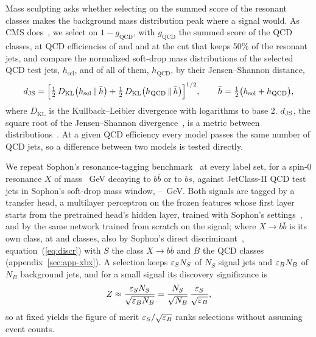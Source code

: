 Mass sculpting asks whether selecting on the summed score of the resonant classes makes the background mass
distribution peak where a signal would. As CMS does~\cite[Sec.~6.2]{cmspart}, we select on
$1 - g_{\mathrm{QCD}}$, with $g_{\mathrm{QCD}}$ the summed score of the QCD classes, at QCD efficiencies of
\SculptEffHigh{} and \SculptEffLow{} and at the cut that keeps 50\% of the resonant jets, and compare the
normalized soft-drop mass distributions of the selected QCD test jets, $h_{\mathrm{sel}}$, and of all of them,
$h_{\mathrm{QCD}}$, by their Jensen--Shannon distance,
\begin{equation}\label{eq:djs}
  d_{\mathrm{JS}} = \Bigl[\tfrac{1}{2}\,D_{\mathrm{KL}}\bigl(h_{\mathrm{sel}}\,\Vert\,\bar h\bigr)
        + \tfrac{1}{2}\,D_{\mathrm{KL}}\bigl(h_{\mathrm{QCD}}\,\Vert\,\bar h\bigr)\Bigr]^{1/2} , \qquad
  \bar h = \tfrac{1}{2}\bigl(h_{\mathrm{sel}} + h_{\mathrm{QCD}}\bigr) ,
\end{equation}
where $D_{\mathrm{KL}}$ is the Kullback--Leibler divergence with logarithms to base 2. $d_{\mathrm{JS}}$, the square root
of the Jensen--Shannon divergence~\cite{lin}, is a metric between distributions~\cite{endres}. At a given
QCD efficiency every model passes the same number of QCD jets, so a difference between two models is tested
directly.

We repeat Sophon's resonance-tagging benchmark~\cite[Sec.~III]{sophon} at every label set, for a spin-0
resonance $X$ of mass \XbxMx~GeV decaying to $b\bar b$ or to $bs$, against JetClass-II QCD test jets in Sophon's
soft-drop mass window, \XbxWindowLo--\XbxWindowHi~GeV. Both signals are tagged by a transfer head, a
multilayer perceptron on the frozen features whose first layer starts from the pretrained head's hidden layer,
trained with Sophon's settings~\cite[App.~B.5]{sophon}, and by the same network trained from scratch on the
signal; where $X\to b\bar b$ is its own class, at \Kfull{} and \Kres{} classes, also by Sophon's direct
discriminant~\cite[Eq.~(4)]{sophon}, equation~(\ref{eq:discr}) with $S$ the class $X\to b\bar b$ and $B$ the QCD
classes (appendix~\ref{sec:app-xbx}). A selection keeps $\varepsilon_S N_S$ of $N_S$ signal jets and $\varepsilon_B N_B$ of $N_B$
background jets, and for a small signal its discovery significance is~\cite{cowan}
\begin{equation}\label{eq:signif}
  Z \approx \frac{\varepsilon_S N_S}{\sqrt{\varepsilon_B N_B}} = \frac{N_S}{\sqrt{N_B}}\,\frac{\varepsilon_S}{\sqrt{\varepsilon_B}} ,
\end{equation}
so at fixed yields the figure of merit $\varepsilon_S/\sqrt{\varepsilon_B}$ ranks selections without assuming event counts.

